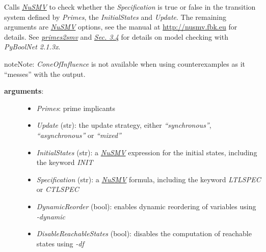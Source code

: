 \documentclass[letterpaper,10pt,english]{sphinxmanual}
\begin{document}
\begin{fulllineitems}
\label{ModelChecking:PyBoolNet.ModelChecking.check_primes_with_counterexample}
Calls {\hyperref[Installation:installation-nusmv]{\emph{NuSMV}}} to check whether the \emph{Specification} is true or false in the transition system defined by \emph{Primes},
the \emph{InitialStates} and \emph{Update}.
The remaining arguments are {\hyperref[Installation:installation-nusmv]{\emph{NuSMV}}} options, see the manual at \href{http://nusmv.fbk.eu}{http://nusmv.fbk.eu} for details.
See {\hyperref[ModelChecking:primes2smv]{\emph{primes2smv}}} and {\hyperref[Manual:sec-model-checking]{\emph{Sec. 3.4}}} for details on model checking with \emph{PyBoolNet 2.1.3x}.

\begin{notice}{note}{Note:}
\emph{ConeOfInfluence} is not available when using counterexamples as it ``messes'' with the output.
\end{notice}
\begin{description}
\item[{\textbf{arguments}:}] \leavevmode\begin{itemize}
\item {} 
\emph{Primes}: prime implicants

\item {} 
\emph{Update} (str): the update strategy, either \emph{``synchronous''}, \emph{``asynchronous''} or \emph{``mixed''}

\item {} 
\emph{InitialStates} (str): a {\hyperref[Installation:installation-nusmv]{\emph{NuSMV}}} expression for the initial states, including the keyword \emph{INIT}

\item {} 
\emph{Specification} (str): a {\hyperref[Installation:installation-nusmv]{\emph{NuSMV}}} formula, including the keyword \emph{LTLSPEC} or \emph{CTLSPEC}

\item {} 
\emph{DynamicReorder} (bool): enables dynamic reordering of variables using \emph{-dynamic}

\item {} 
\emph{DisableReachableStates} (bool): disables the computation of reachable states using \emph{-df}


\end{itemize}
\end{description}
\end{fulllineitems}
\end{document}
